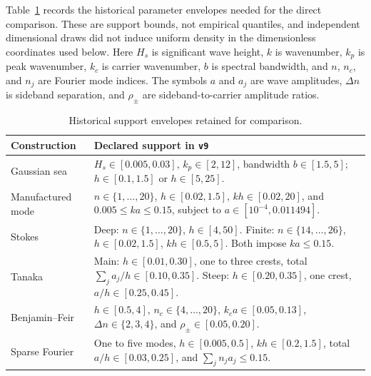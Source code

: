 \documentclass[11pt]{article}
\begin{document}
Table~\ref{tab:v9-supports} records the historical parameter envelopes needed
for the direct comparison.  These are support bounds, not empirical
quantiles, and independent dimensional draws did not induce uniform density
in the dimensionless coordinates used below.  Here $H_s$ is significant wave
height, $k$ is wavenumber, $k_p$ is peak wavenumber, $k_c$ is carrier
wavenumber, $b$ is spectral bandwidth, and $n$, $n_c$, and $n_j$ are Fourier
mode indices.  The symbols $a$ and $a_j$ are wave amplitudes, $\Delta n$ is
sideband separation, and $\rho_\pm$ are sideband-to-carrier amplitude ratios.

\begin{table}[ht]
  \centering
  \caption{Historical support envelopes retained for comparison.}
  \label{tab:v9-supports}
  \small
  \begin{tabularx}{\textwidth}{
    @{}>{\raggedright\arraybackslash}p{}
       >{\raggedright\arraybackslash}X@{}}
    \toprule
    Construction & Declared support in \texttt{v9} \\
    \midrule
    Gaussian sea
      & $H_s\in[0.005,0.03]$, $k_p\in[2,12]$, bandwidth
        $b\in[1.5,5]$; $h\in[0.1,1.5]$ or $h\in[5,25]$. \\
    Manufactured mode
      & $n\in\{1,\ldots,20\}$, $h\in[0.02,1.5]$,
        $kh\in[0.02,20]$, and $0.005\leq ka\leq0.15$, subject to
        $a\in[10^{-4},0.011494]$. \\
    Stokes
      & Deep: $n\in\{1,\ldots,20\}$, $h\in[4,50]$.
        Finite: $n\in\{14,\ldots,26\}$, $h\in[0.02,1.5]$,
        $kh\in[0.5,5]$.  Both impose $ka\leq0.15$. \\
    Tanaka
      & Main: $h\in[0.01,0.30]$, one to three crests, total
        $\sum_j a_j/h\in[0.10,0.35]$.  Steep: $h\in[0.20,0.35]$,
        one crest, $a/h\in[0.25,0.45]$. \\
    Benjamin--Feir
      & $h\in[0.5,4]$, $n_c\in\{4,\ldots,20\}$,
        $k_ca\in[0.05,0.13]$, $\Delta n\in\{2,3,4\}$, and
        $\rho_\pm\in[0.05,0.20]$. \\
    Sparse Fourier
      & One to five modes, $h\in[0.005,0.5]$,
        $kh\in[0.2,1.5]$, total $a/h\in[0.03,0.25]$, and
        $\sum_j n_ja_j\leq0.15$. \\
    \bottomrule
  \end{tabularx}
\end{table}
\end{document}
